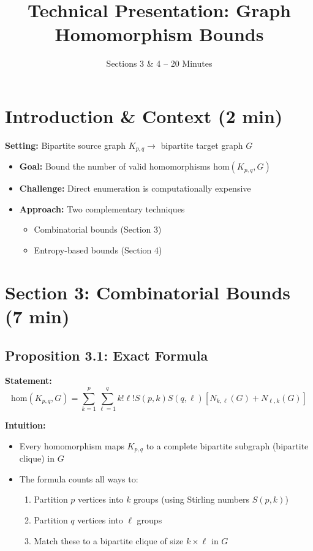 \documentclass[12pt,a4paper]{article}
\title{Technical Presentation: Graph Homomorphism Bounds}
\subtitle{Sections 3 \& 4 -- 20 Minutes}
\author{}
\date{}
\begin{document}
\maketitle

\section{Introduction \& Context (2 min)}

\textbf{Setting:} Bipartite source graph $K_{p,q} \to$ bipartite target graph $G$

\begin{itemize}
    \item \textbf{Goal:} Bound the number of valid homomorphisms $\text{hom}(K_{p,q}, G)$
    \item \textbf{Challenge:} Direct enumeration is computationally expensive
    \item \textbf{Approach:} Two complementary techniques
    \begin{itemize}
        \item Combinatorial bounds (Section 3)
        \item Entropy-based bounds (Section 4)
    \end{itemize}
\end{itemize}

\section{Section 3: Combinatorial Bounds (7 min)}

\subsection{Proposition 3.1: Exact Formula}

\textbf{Statement:}
\[
\text{hom}(K_{p,q}, G) = \sum_{k=1}^p \sum_{\ell=1}^q k!\ell! S(p,k)S(q,\ell)[N_{k,\ell}(G) + N_{\ell,k}(G)]
\]

\textbf{Intuition:}
\begin{itemize}
    \item Every homomorphism maps $K_{p,q}$ to a complete bipartite subgraph (bipartite clique) in $G$
    \item The formula counts all ways to:
    \begin{enumerate}
        \item Partition $p$ vertices into $k$ groups (using Stirling numbers $S(p,k)$)
        \item Partition $q$ vertices into $\ell$ groups
        \item Match these to a bipartite clique of size $k \times \ell$ in $G$
    \end{enumerate}
\end{itemize}
\end{document}
